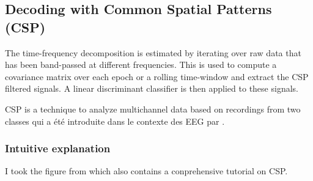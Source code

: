 \subsection{Decoding with Common Spatial Patterns (CSP)}


The time-frequency decomposition is estimated by iterating over raw data that has been band-passed at different frequencies. This is used to compute a covariance matrix over each epoch or a rolling time-window and extract the CSP filtered signals. A linear discriminant classifier is then applied to these signals.

CSP is a technique to analyze multichannel data based on recordings from two classes qui a été introduite dans le contexte des EEG par \cite{koles1990spatial}.

\subsubsection{Intuitive explanation}


I took the figure from \cite{blankertz2007optimizing} which also contains a conprehensive tutorial on CSP.

